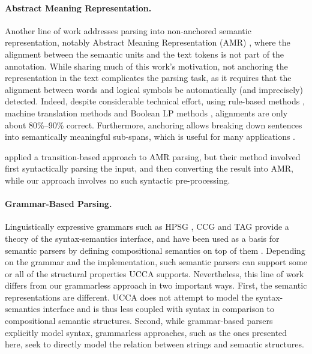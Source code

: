 \documentclass[11pt]{article}
\begin{document}
\paragraph{Abstract Meaning Representation.}
Another line of work addresses parsing into non-anchored
semantic representation, notably Abstract Meaning Representation (AMR)
\cite{flanigan2014discriminative,vanderwende2015amr,pust2015parsing,artzi2015broad},
where the alignment between the semantic units and the text tokens is not part of the annotation.
While sharing much of this work's motivation,
not anchoring the representation in the text
complicates the parsing task, as it requires
that the alignment between words and logical symbols be automatically
(and imprecisely) detected. Indeed, despite considerable technical effort,
using rule-based methods \cite{flanigan2014discriminative}, machine translation methods \cite{pourdamghani2014aligning} and Boolean LP methods \cite{werling2015robust}, alignments are only about 80\%--90\% correct.
Furthermore, anchoring allows breaking down sentences into semantically meaningful sub-spans,
which is useful for many applications \cite{fernandez2015parsing,birch2016hume}.

 applied a transition-based approach to AMR parsing,
but their method involved first syntactically parsing the input, and then converting
the result into AMR, while our approach involves no such syntactic pre-processing.

\paragraph{Grammar-Based Parsing.}
Linguistically expressive grammars such as HPSG \cite{PandS:94}, CCG \cite{Steedman:00} and TAG \cite{Joshi:97}
provide a theory of the syntax-semantics interface, and have been used as a basis for semantic parsers
by defining compositional semantics on top of them \cite[among others]{Flic:00,bos2005towards}.
Depending on the grammar and the implementation, such semantic parsers can support
some or all of the structural properties UCCA supports.
Nevertheless, this line of work differs from our grammarless approach in two important ways.
First, the semantic representations are different. UCCA does not attempt to model
the syntax-semantics interface and is thus less coupled with syntax in comparison to
compositional semantic structures.
Second, while grammar-based parsers explicitly model syntax, grammarless
approaches, such as the ones presented here, seek to directly model the relation between
strings and semantic structures.
\end{document}

